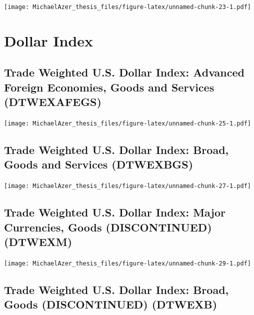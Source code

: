 \documentclass[]{book}
\begin{document}
\texttt{[image: MichaelAzer\_thesis\_files/figure-latex/unnamed-chunk-23-1.pdf]}

\hypertarget{dollar-index}{%
\section{Dollar Index}\label{dollar-index}}

\hypertarget{trade-weighted-u.s.-dollar-index-advanced-foreign-economies-goods-and-services-dtwexafegs}{%
\subsection{Trade Weighted U.S. Dollar Index: Advanced Foreign Economies, Goods and Services (DTWEXAFEGS)}\label{trade-weighted-u.s.-dollar-index-advanced-foreign-economies-goods-and-services-dtwexafegs}}

\texttt{[image: MichaelAzer\_thesis\_files/figure-latex/unnamed-chunk-25-1.pdf]}

\hypertarget{trade-weighted-u.s.-dollar-index-broad-goods-and-services-dtwexbgs}{%
\subsection{Trade Weighted U.S. Dollar Index: Broad, Goods and Services (DTWEXBGS)}\label{trade-weighted-u.s.-dollar-index-broad-goods-and-services-dtwexbgs}}

\texttt{[image: MichaelAzer\_thesis\_files/figure-latex/unnamed-chunk-27-1.pdf]}

\hypertarget{trade-weighted-u.s.-dollar-index-major-currencies-goods-discontinued-dtwexm}{%
\subsection{Trade Weighted U.S. Dollar Index: Major Currencies, Goods (DISCONTINUED) (DTWEXM)}\label{trade-weighted-u.s.-dollar-index-major-currencies-goods-discontinued-dtwexm}}

\texttt{[image: MichaelAzer\_thesis\_files/figure-latex/unnamed-chunk-29-1.pdf]}

\hypertarget{trade-weighted-u.s.-dollar-index-broad-goods-discontinued-dtwexb}{%
\subsection{Trade Weighted U.S. Dollar Index: Broad, Goods (DISCONTINUED) (DTWEXB)}\label{trade-weighted-u.s.-dollar-index-broad-goods-discontinued-dtwexb}}
\end{document}

